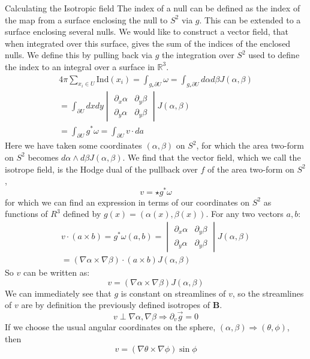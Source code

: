 \documentclass[final]{beamer}
\newlength{\onecolwid}
\begin{document}
\begin{frame}[t]
\begin{columns}[t]
\begin{column}{\onecolwid}
\begin{block}{Calculating the Isotropic field}
The index of a null can be defined as the index of the map from a surface
enclosing the null to $S^2$ via $g$. This can be extended to a surface
enclosing several nulls. We would like to construct a vector field,
that when integrated over this surface, gives the sum of the indices of
the enclosed nulls. We define this by pulling back via $g$ the
integration over $S^2$ used to define the index to an integral over a
surface in $\mathbb{R}^3$.\\
	\begin{multline}
		4\pi\sum_{x_i\in U}\mathrm{Ind}(x_i)=\int_{g_*\partial U}\omega=\int_{g_*\partial U}d\alpha d\beta J(\alpha,\beta)\\
		=\int_{\partial U}dxdy
\begin{vmatrix}
  \partial_x\alpha & \partial_y \beta \\
  \partial_y\alpha & \partial_y \beta
\end{vmatrix}
	J(\alpha,\beta)\\
=\int_{\partial U}g^*\omega=\int_{\partial U}v\cdot da
	\end{multline}
Here we have taken some coordinates $(\alpha,\beta)$ on $S^2$, for which the
	area two-form on $S^2$ becomes $d\alpha\wedge d\beta J(\alpha,\beta)$.
	We find that the vector field, which we call the isotrope field, is the
	Hodge dual of the pullback over $f$ of the area two-form on $S^2$,
	\begin{equation}
		v=\star g^*\omega
	\end{equation}
for which we can find an expression in terms of our coordinates on $S^2$ as functions of
	$R^3$ defined by $g(x)=(\alpha(x),\beta(x))$. For any two vectors $a,b$:
	\begin{multline}
		v\cdot(a\times b)=g^*\omega(a,b)=
\begin{vmatrix}
  \partial_x\alpha & \partial_y \beta \\
  \partial_y\alpha & \partial_y \beta
\end{vmatrix}
J(\alpha,\beta)\\
		=(\nabla\alpha\times\nabla\beta)\cdot(a\times b)J(\alpha,\beta)
	\end{multline}
So $v$ can be written as:
	\begin{equation}
		v=(\nabla\alpha\times\nabla\beta)J(\alpha,\beta)
	\end{equation}
We can immediately see that $g$ is constant on streamlines of $v$, so the streamlines of $v$ are by definition the previously defined isotropes of $\mathbf{B}$.
	\begin{equation}
		v\perp\nabla\alpha,\nabla\beta\Rightarrow\partial_v\vec g=0
	\end{equation}
If we choose the usual angular coordinates on the sphere, $(\alpha,\beta)\Rightarrow(\theta,\phi)$, then
	\begin{equation}
		v=(\nabla\theta\times\nabla\phi)\sin\phi
	\end{equation}


\end{block}
\end{column}
\end{columns}
\end{frame}
\end{document}
